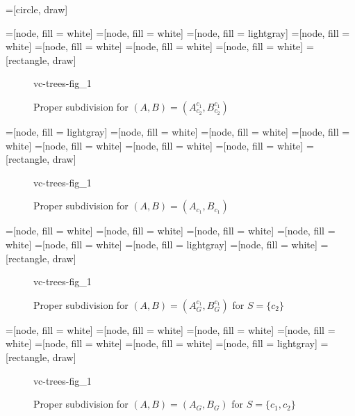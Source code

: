 
	=[circle, draw]

	=[node, fill = white]
	=[node, fill = white]
	=[node, fill = lightgray]
	=[node, fill = white]
	=[node, fill = white]
	=[node, fill = white]
	=[node, fill = white]
	=[rectangle, draw]

	\begin{figure}[p]
		 {vc-trees-fig_1}
		\caption{Proper subdivision for $(A, B) = (A^{c_1}_{c_2}, B^{c_1}_{c_2})$}
	\end{figure}
	
	=[node, fill = lightgray]
	=[node, fill = white]
	=[node, fill = white]
	=[node, fill = white]
	=[node, fill = white]
	=[node, fill = white]
	=[node, fill = white]
	=[rectangle, draw]

	\begin{figure}[p]
		 {vc-trees-fig_1}
		\caption{Proper subdivision for $(A, B) = (A_{c_1}, B_{c_1})$}
	\end{figure}

	=[node, fill = white]
	=[node, fill = white]
	=[node, fill = white]
	=[node, fill = white]
	=[node, fill = white]
	=[node, fill = lightgray]
	=[node, fill = white]
	=[rectangle, draw]

	\begin{figure}[p]
		 {vc-trees-fig_1}
		\caption{Proper subdivision for $(A, B) = (A^{c_1}_G, B^{c_1}_G)$ for $S = \{c_2\}$}
	\end{figure}

	=[node, fill = white]
	=[node, fill = white]
	=[node, fill = white]
	=[node, fill = white]
	=[node, fill = white]
	=[node, fill = white]
	=[node, fill = lightgray]
	=[rectangle, draw]

	\begin{figure}[p]
		 {vc-trees-fig_1}
		\caption{Proper subdivision for $(A, B) = (A_G, B_G)$ for $S = \{c_1, c_2\}$}
	\end{figure}
